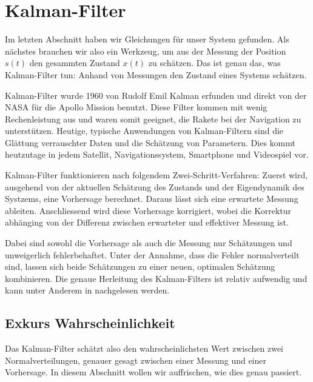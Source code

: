 %
%
%
%
%

\section{Kalman-Filter}
Im letzten Abschnitt haben wir Gleichungen für unser System gefunden.
Als nächstes brauchen wir also ein Werkzeug,
um aus der Messung der Position $s(t)$ den gesammten Zustand $x(t)$ zu schätzen.
Das ist genau das, was Kalman-Filter tun:
Anhand von Messungen den Zustand eines Systems schätzen.

Kalman-Filter wurde 1960 von Rudolf Emil Kalman erfunden und direkt von der NASA für die Apollo Mission benutzt.
Diese Filter kommen mit wenig Rechenleistung aus und waren somit geeignet, die Rakete bei der Navigation zu unterstützen. 
Heutige, typische Anwendungen von Kalman-Filtern sind die Glättung verrauschter Daten und die Schätzung von Parametern.
Dies kommt heutzutage in jedem Satellit, Navigationssystem, Smartphone und Videospiel vor.

Kalman-Filter funktionieren nach folgendem Zwei-Schritt-Verfahren:
Zuerst wird,
ausgehend von der aktuellen Schätzung des Zustands und der Eigendynamik des Systzems,
eine Vorhersage berechnet.
Daraus lässt sich eine erwartete Messung ableiten.
Anschliessend wird diese Vorhersage korrigiert,
wobei die Korrektur abhänging von der Differenz zwischen erwarteter und effektiver Messung ist.

Dabei sind sowohl die Vorhersage als auch die Messung nur Schätzungen und unweigerlich fehlerbehaftet.
Unter der Annahme, dass die Fehler normalverteilt sind,
lassen sich beide Schätzungen zu einer neuen, optimalen Schätzung kombinieren.
Die genaue Herleitung des Kalman-Filters ist relativ aufwendig
und kann unter Anderem in \cite{erdbeben:skript:wrstat} nachgelesen werden.

\subsection{Exkurs Wahrscheinlichkeit} 
\label{erdbeben:Wahrscheindlichkeit} 
Das Kalman-Filter schätzt also den wahrscheinlichsten Wert zwischen zwei Normalverteilungen,
genauer gesagt zwischen einer Messung und einer Vorhersage.
In diesem Abschnitt wollen wir auffrischen, wie dies genau passiert.

